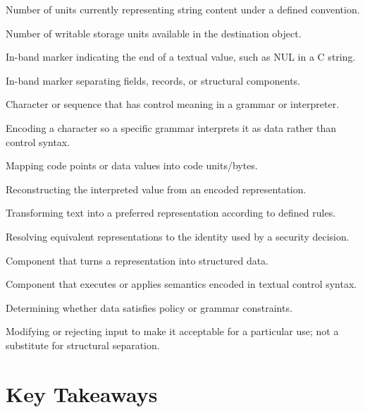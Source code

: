 \documentclass[11pt]{article}
\newcommand{\term}[1]{\textbf{#1}}
\begin{document}
\begin{description}[style=nextline,leftmargin=0.24in]
  \item[\term{String length}] Number of units currently representing string content under a defined convention.
  \item[\term{Buffer capacity}] Number of writable storage units available in the destination object.
  \item[\term{Terminator}] In-band marker indicating the end of a textual value, such as NUL in a C string.
  \item[\term{Delimiter}] In-band marker separating fields, records, or structural components.
  \item[\term{Metacharacter}] Character or sequence that has control meaning in a grammar or interpreter.
  \item[\term{Escaping}] Encoding a character so a specific grammar interprets it as data rather than control syntax.
  \item[\term{Encoding}] Mapping code points or data values into code units/bytes.
  \item[\term{Decoding}] Reconstructing the interpreted value from an encoded representation.
  \item[\term{Normalization}] Transforming text into a preferred representation according to defined rules.
  \item[\term{Canonicalization}] Resolving equivalent representations to the identity used by a security decision.
  \item[\term{Parser}] Component that turns a representation into structured data.
  \item[\term{Interpreter}] Component that executes or applies semantics encoded in textual control syntax.
  \item[\term{Validation}] Determining whether data satisfies policy or grammar constraints.
  \item[\term{Sanitization}] Modifying or rejecting input to make it acceptable for a particular use; not a substitute for structural separation.
\end{description}
\clearpage

\section{Key Takeaways}
\end{document}
